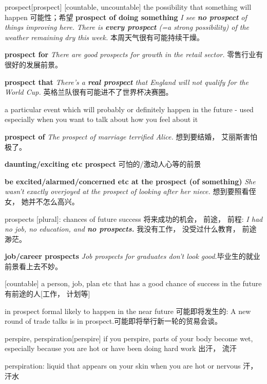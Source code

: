 \begin{DefWord}{prospect}[prospect]
    [countable, uncountable] the possibility that something will happen 可能性；希望
    \textbf{prospect of doing something}
    \textit{I see \textbf{no prospect} of things improving here.}
    \textit{There is \textbf{every prospect} (=a strong possibility) of the weather remaining dry this week.} 本周天气很有可能持续干燥。 
    
    \textbf{prospect for}
    \textit{There are good prospects for growth in the retail sector.} 零售行业有很好的发展前景。 

    \textbf{prospect that}
    \textit{There's a \textbf{real prospect} that England will not qualify for the World Cup.} 英格兰队很有可能进不了世界杯决赛圈。 

    a particular event which will probably or definitely happen in the future - used especially when you want to talk about how you feel about it

    \textbf{prospect of}
    \textit{The prospect of marriage terrified Alice.} 想到要结婚， 艾丽斯害怕极了。 
    
\textbf{daunting/exciting etc prospect} 可怕的/激动人心等的前景

\textbf{be excited/alarmed/concerned etc at the prospect (of something)}
 \textit{She wasn't exactly overjoyed at the prospect of looking after her niece.} 想到要照看侄女， 她并不怎么高兴。 

prospects [plural]: chances of future success 将来成功的机会， 前途， 前程:
 \textit{I had no job, no education, and \textbf{no prospects.}} 我没有工作， 没受过什么教育， 前途渺茫。 

\textbf{job/career prospects}
 \textit{Job prospects for graduates don't look good.}毕业生的就业前景看上去不妙。 

[countable] a person, job, plan etc that has a good chance of success in the future 有前途的人[工作， 计划等]

in prospect formal likely to happen in the near future 可能即将发生的:
 A new round of trade talks is in prospect.可能即将举行新一轮的贸易会谈。 
\end{DefWord}

\begin{DefWord}{perspire, perspiration}[perspire]
    if you perspire, parts of your body become wet, especially because you are hot or have been doing hard work 出汗， 流汗

    perspiration: liquid that appears on your skin when you are hot or nervous 汗， 汗水
\end{DefWord}

